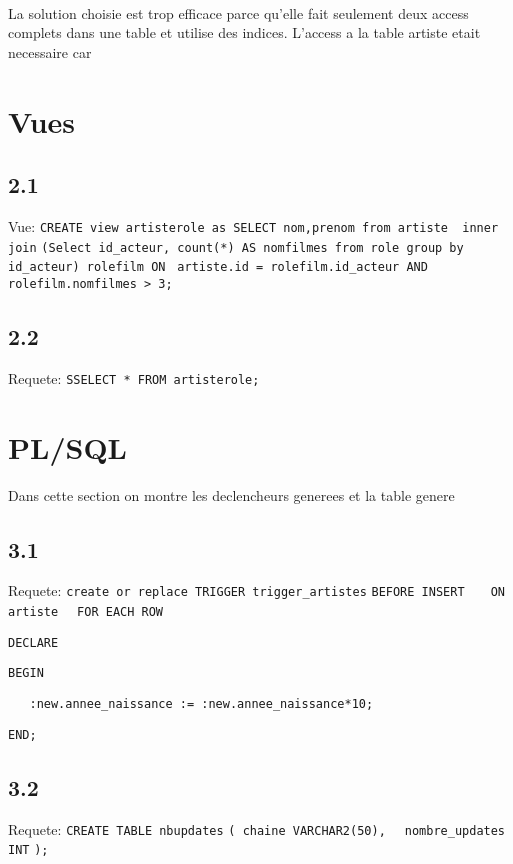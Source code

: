 \documentclass{article}
\begin{document}
\paragraph{ }La solution choisie est trop efficace parce qu'elle fait seulement
deux access complets dans une table et utilise des indices. L'access a la table artiste
etait necessaire car 


\section{Vues}


\subsection{2.1}
\label{laSousSectionDEuxUn}
Vue:
\verb!CREATE view artisterole as SELECT nom,prenom from artiste  inner join!
\verb!(Select id_acteur, count(*) AS nomfilmes from role group by id_acteur) rolefilm ON ! 
\verb!artiste.id = rolefilm.id_acteur AND rolefilm.nomfilmes > 3;! 

\subsection{2.2}
\label{laSousSectionDeuxDeux}
Requete:
\verb!SSELECT * FROM artisterole;! 



\section{PL/SQL}
Dans cette section on montre les declencheurs generees et la table genere

\subsection{3.1}
Requete:
\verb!create or replace TRIGGER trigger_artistes!
\verb!BEFORE INSERT!
\verb!   ON artiste!
\verb!  FOR EACH ROW!
   
\verb!DECLARE!

   
\verb!BEGIN!

\verb!   :new.annee_naissance := :new.annee_naissance*10;!
   
\verb!END;! 

\subsection{3.2}Requete:
\verb!CREATE TABLE nbupdates! 
\verb!( chaine VARCHAR2(50),! 
\verb!  nombre_updates INT! 
\verb!);! 
\end{document}
